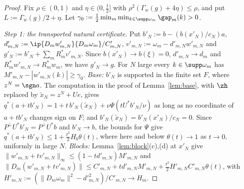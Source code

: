 \begin{proof}
Fix $\rho\in(0,1)$ and $\eta\in(0,\frac12]$ with $\rho^2(\Gamma_w(g)+4\eta)\le\rho$, and
put $L:=\Gamma_w(g)/2+\eta$.  Let $\gamma_0:=\frac12\min_m\min_{k\in\supp
\omega_m}\gap_m(k)>0$.

\emph{Step 1: the transported natural certificate.}  Put
$b'_N:=b-(b(x'_N)/c_N)a$, $d'_{m,N}:=\ip{D_mw'_{m,N}}{D_m\omega_m}/C'_{m,N}$,
$v'_{m,N}:=\omega_m-d'_{m,N}w'_{m,N}$ and
$g'_N:=b'_N+\sum_mR_m^*v'_{m,N}$.  Since $b(x'_N)\to b(\xi)=0$,
$d'_{m,N}\to d_m$ and $R_m^*w'_{m,N}\to R_m^*w_m$, we have $g'_N\to g$.  For
$N$ large every $k\in\supp\omega_m$ has $M'_{m,N}-|w'_{m,N}(k)|\ge\gamma_0$.
\emph{Base:} $b'_N$ is supported in the finite set $F$, where
$z^N=\sgn a$.  The computation in the proof of Lemma~\ref{lem:base}, with
$\zh$ replaced by $\tilde x_N=z^N+Ue$, gives
$q^*(a+tb'_N)=1+t\,b'_N(\tilde x_N)+\nu\Psi(tU^*b'_N/\nu)$ as long as no
coordinate of $a+tb'_N$ changes sign on $F$; and
$b'_N(\tilde x_N)=b'_N(x'_N)/c_N=0$.  Since $P^\perp U^*b'_N=P^\perp U^*b$
and $b'_N\to b$, the bounds for $\Psi$ give
$q^*(a+tb'_N)\le1+\frac{t^2}2H_b\theta(t)$, where here and below
$\theta(t)\to1$ as $t\to0$, uniformly in large $N$.
\emph{Blocks:} Lemma~\ref{lem:block}(c),(d) at $x'_N$ give
$\|w'_{m,N}+tv'_{m,N}\|_\infty\le(1-td'_{m,N})M'_{m,N}$ and
$\|D_m(w'_{m,N}+tv'_{m,N})\|\le C'_{m,N}+td'_{m,N}M'_{m,N}+\frac{t^2}2
H'_{m,N}C'_{m,N}\theta(t)$, with $H'_{m,N}:=(\|D_m\omega_m\|^2-d'^2_{m,N})/
C'_{m,N}\to H_m$.


\end{proof}
